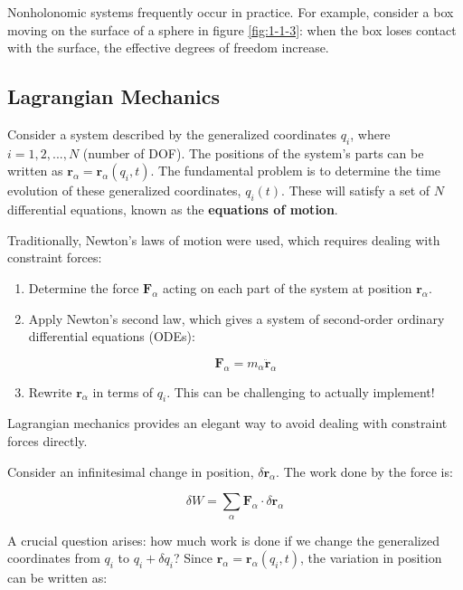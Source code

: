 Nonholonomic systems frequently occur in practice. For example, consider a box moving on the surface of a sphere in figure \ref{fig:1-1-3}: when the box loses contact with the surface, the effective degrees of freedom increase.

\subsection{Lagrangian Mechanics}

Consider a system described by the generalized coordinates $q_i$, where $i = 1, 2, ..., N$ (number of DOF). The positions of the system's parts can be written as $\mathbf{r}_\alpha = \mathbf{r}_\alpha(q_i, t)$. The fundamental problem is to determine the time evolution of these generalized coordinates, $q_i(t)$. These will satisfy a set of $N$ differential equations, known as the \textbf{equations of motion}.

Traditionally, Newton's laws of motion were used, which requires dealing with constraint
forces:

\begin{enumerate}
    \item Determine the force $\mathbf{F}_\alpha$ acting on each part of the system at
          position $\mathbf{r}_\alpha$.
    \item Apply Newton's second law, which gives a system of second-order ordinary
          differential equations (ODEs):

          \begin{equation}
              \mathbf{F}_\alpha = m_\alpha \ddot{\mathbf{r}}_\alpha
          \end{equation}

    \item  Rewrite $\mathbf{r}_\alpha$ in terms of $q_i$. This can be challenging to
          actually implement!
\end{enumerate}

Lagrangian mechanics provides an elegant way to avoid dealing with constraint forces
directly.

Consider an infinitesimal change in position, $\delta \mathbf{r}_\alpha$. The work done
by the force is:

\begin{equation}
    \delta W = \sum_{\alpha} \mathbf{F}_\alpha \cdot \delta \mathbf{r}_\alpha
\end{equation}

A crucial question arises: how much work is done if we change the generalized coordinates
from $q_i$ to $q_i + \delta q_i$? Since $\mathbf{r}_\alpha = \mathbf{r}_\alpha(q_i, t)$,
the variation in position can be written as:

